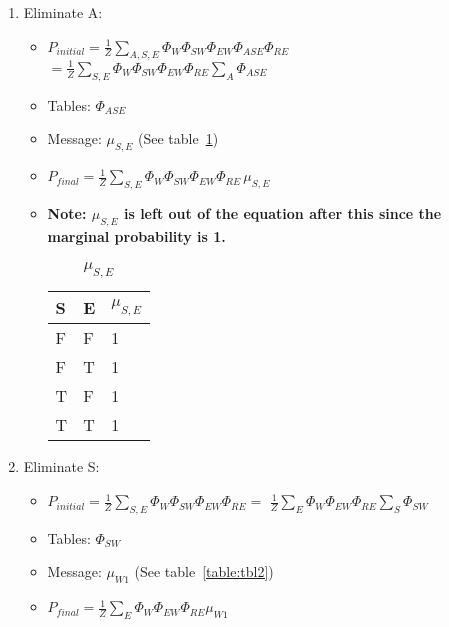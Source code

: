 \documentclass{article}
\begin{document}
\begin{enumerate}[label=(\alph*)]
\begin{enumerate}[label=\roman*.]
\begin{enumerate}[label=\alph*.]

\item Eliminate A:

\begin{itemize}

\item $P_{initial}=\frac{1}{Z}\sum_{A,S,E}\Phi_{W}\Phi_{SW}\Phi_{EW}\Phi_{ASE}\Phi_{RE}$ 
$=\frac{1}{Z}\sum_{S,E}\Phi_{W}\Phi_{SW}\Phi_{EW}\Phi_{RE}\sum_A\Phi_{ASE}$

\item Tables: $\Phi_{ASE}$

\item Message: $\mu_{S,E}$ (See table~\ref{table:tbl1})

\item $P_{final}=\frac{1}{Z}\sum_{S,E}\Phi_{W}\Phi_{SW}\Phi_{EW}\Phi_{RE}\,\mu_{S,E}$ 

\item \textbf{Note:  $\mu_{S,E}$ is left out of the equation after this since the marginal probability is 1.}

\begin{table}[h]
\centering
\caption{$\mu_{S,E}$}
\label{table:tbl1}
\begin{tabular}{|l|l|l|}
\hline
 S & E & $\mu_{S,E}$   \\
\hline \hline
 F & F & 1  \\
 F & T & 1  \\
 T & F & 1  \\
 T & T & 1 \\
\hline
\end{tabular}
\end{table}

\end{itemize}

\item Eliminate S:

\begin{itemize}

\item $P_{initial}=\frac{1}{Z}\sum_{S,E}\Phi_{W}\Phi_{SW}\Phi_{EW}\Phi_{RE}=$
$\frac{1}{Z}\sum_{E}\Phi_{W}\Phi_{EW}\Phi_{RE}\sum_S\Phi_{SW}$ 

\item Tables: $\Phi_{SW}$

\item Message: $\mu_{W1}$ (See table~\ref{table:tbl2})

\item $P_{final}=\frac{1}{Z}\sum_{E}\Phi_{W}\Phi_{EW}\Phi_{RE}\mu_{W1}$


\end{itemize}
\end{enumerate}
\end{enumerate}
\end{enumerate}
\end{document}
